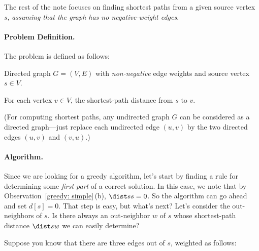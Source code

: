 
The rest of the note focuses on finding shortest paths from a given source vertex $s$,
\emph{assuming that the graph has no negative-weight edges}.

\paragraph{Problem Definition.}

The  problem is defined as follows:

\begin{mylist}
\item[\bf input:]
  Directed graph $G=(V,E)$ with \emph{non-negative} edge weights
  and source vertex $s\in V$.

\item[\bf output:]
  For each vertex $v\in V$,
  the shortest-path distance from $s$ to $v$.
\end{mylist}
(For computing shortest paths, any undirected graph $G$ can be considered as a directed graph---just replace each undirected edge $(u,v)$ by the two directed edges $(u,v)$ and $(v,u)$.)

\paragraph{Algorithm.}
Since we are looking for a greedy algorithm,
let's start by finding a rule for determining some \emph{first part}
of a correct solution.
In this case, we note that by Observation~\ref{greedy: simple}\,(b), $\dist s s = 0$.
So the algorithm can go ahead and set $d[s] = 0$.
That step is easy, but what's next?
Let's consider the out-neighbors of $s$.
Is there always an out-neighbor $w$ of $s$
whose shortest-path distance $\dist s w$
we can easily determine?

Suppose you know that there are three edges out of $s$, weighted as follows:



